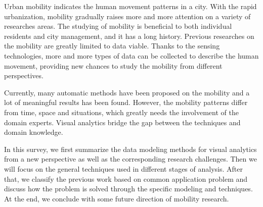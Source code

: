 \abstract
\label{chap:abs}

Urban mobility indicates the human movement patterns in a city. With the rapid urbanization, mobility gradually raises more and more attention on a variety of researches areas. The studying of mobility is beneficial to both individual residents and city management, and it has a long history. Previous researches on the mobility are greatly limited to data viable. Thanks to the sensing technologies, more and more types of data can be collected to describe the human movement, providing new chances to study the mobility from different perspectives.  

Currently, many automatic methods have been proposed on the mobility and a lot of meaningful results has been found. However, the mobility patterns differ from time, space and situations, which greatly needs the involvement of the domain experts. Visual analytics bridge the gap between the techniques and domain knowledge.
  
In this survey, we first summarize the data modeling methods for visual analytics from a new perspective as well as the corresponding research challenges. Then we will focus on the general techniques used in different stages of analysis. After that, we classify the previous work based on common application problem and discuss how the problem is solved through the specific modeling and techniques.  At the end, we conclude with some future direction of mobility research.


\endabstract 
